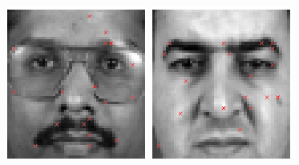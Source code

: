 \begin{figure}[ht]
\begin{center}
\includegraphics[width=\textwidth/9]{ch4/figures/NoC3.png}
\includegraphics[width=\textwidth/9]{ch4/figures/NoC4.png}

\end{center}
\end{figure}

